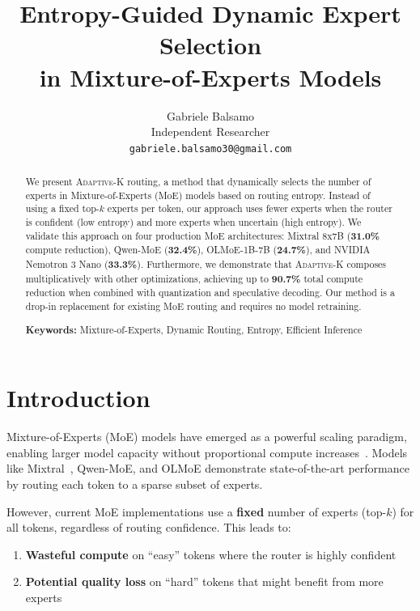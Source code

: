 \documentclass{article}
\title{Entropy-Guided Dynamic Expert Selection\\in Mixture-of-Experts Models}
\author{
  Gabriele Balsamo\\
  Independent Researcher\\
  \texttt{gabriele.balsamo30@gmail.com}\\
  \And
}
\newcommand{\adaptivek}{\textsc{Adaptive-K}}
\begin{document}
\maketitle

\begin{abstract}
We present \adaptivek{} routing, a method that dynamically selects the number of experts in Mixture-of-Experts (MoE) models based on routing entropy. Instead of using a fixed top-$k$ experts per token, our approach uses fewer experts when the router is confident (low entropy) and more experts when uncertain (high entropy). We validate this approach on four production MoE architectures: Mixtral 8x7B (\textbf{31.0\%} compute reduction), Qwen-MoE (\textbf{32.4\%}), OLMoE-1B-7B (\textbf{24.7\%}), and NVIDIA Nemotron 3 Nano (\textbf{33.3\%}). Furthermore, we demonstrate that \adaptivek{} composes multiplicatively with other optimizations, achieving up to \textbf{90.7\%} total compute reduction when combined with quantization and speculative decoding. Our method is a drop-in replacement for existing MoE routing and requires no model retraining.

\textbf{Keywords:} Mixture-of-Experts, Dynamic Routing, Entropy, Efficient Inference
\end{abstract}

\section{Introduction}
\label{sec:intro}

Mixture-of-Experts (MoE) models have emerged as a powerful scaling paradigm, enabling larger model capacity without proportional compute increases~\citep{shazeer2017outrageously, fedus2022switch}. Models like Mixtral~\citep{jiang2024mixtral}, Qwen-MoE, and OLMoE demonstrate state-of-the-art performance by routing each token to a sparse subset of experts.

However, current MoE implementations use a \textbf{fixed} number of experts (top-$k$) for all tokens, regardless of routing confidence. This leads to:
\begin{enumerate}
    \item \textbf{Wasteful compute} on ``easy'' tokens where the router is highly confident
    \item \textbf{Potential quality loss} on ``hard'' tokens that might benefit from more experts
\end{enumerate}
\end{document}
